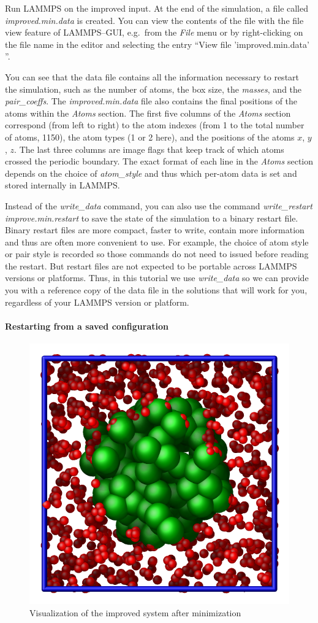 \documentclass[9pt,tutorial]{livecoms}
\begin{document}
Run LAMMPS on the improved input.  At the end of the simulation, a file
called \textit{improved.min.data} is created.  You can view the contents
of the file with the file view feature of LAMMPS--GUI, e.g.~from the
\textit{File} menu or by right-clicking on the file name in the editor
and selecting the entry ``View file 'improved.min.data' ''.

You can see that the data file contains all the information necessary to
restart the simulation, such as the number of atoms, the box size, the
\textit{masses}, and the \textit{pair\_coeffs}.  The
\textit{improved.min.data} file also contains the final
positions of the atoms within the \textit{Atoms} section. The first five
columns of the \textit{Atoms} section correspond (from left to right) to
the atom indexes (from 1 to the total number of atoms, 1150), the atom
types (1 or 2 here), and the positions of the atoms $x$, $y$, $z$. The
last three columns are image flags that keep track of which atoms
crossed the periodic boundary.  The exact format of each line in the
\textit{Atoms} section depends on the choice of \textit{atom\_style} and
thus which per-atom data is set and stored internally in LAMMPS.

\begin{note}
  Instead of the \textit{write\_data} command, you can also use the
  command \textit{write\_restart improve.min.restart} to save the state
  of the simulation to a binary restart file.  Binary restart files are
  more compact, faster to write, contain more information and thus are
  often more convenient to use.  For example, the choice of atom style
  or pair style is recorded so those commands do not need to issued
  before reading the restart.  But restart files are not expected to be
  portable across LAMMPS versions or platforms.  Thus, in this tutorial
  we use \textit{write\_data} so we can provide you with a reference
  copy of the data file in the solutions that will work for you,
  regardless of your LAMMPS version or platform.
\end{note}

\paragraph{Restarting from a saved configuration}

\begin{figure}
\centering
\includegraphics[width=0.55\linewidth]{LJ-cylinder}
\caption{Visualization of the improved system after minimization}
\label{fig:improved-min}
\end{figure}
\end{document}
